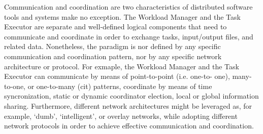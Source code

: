 \documentclass{sig-alternate}
\begin{document}
Communication and coordination are two  characteristics of distributed
software tools and \pilotjob systems make no exception. The Workload
Manager and the Task Executor are separate and well-defined logical
components that need to communicate and coordinate in order to exchange
tasks, input/output files, and related data. Nonetheless, the \pilotjob
paradigm is nor defined by any specific communication and coordination
pattern, nor by any specific network architecture or protocol. For
exmaple, the Workload Manager and the Task Executor can communicate by
means of point-to-point (i.e. one-to- one), many-to-one, or one-to-many
(cit) patterns, coordinate by means of time syncronization, static or
dynamic coordinator election, local or global information sharing.
Furthermore, different network architectures might be leveraged as, for
example, `dumb',  `intelligent', or overlay networks, while adopting
different network protocols in order to achieve effective communication
and coordination.

\end{document}
